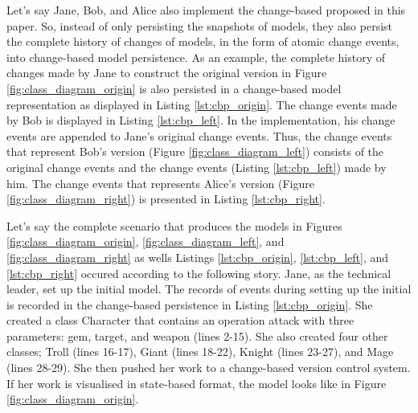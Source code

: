 Let's say Jane, Bob, and Alice also implement the change-based proposed in this paper. So, instead of only persisting the snapshots of models, they also persist the complete history of changes of models, in the form of atomic change events, into change-based model persistence. As an example, the complete history of changes made by Jane to construct the original version in Figure \ref{fig:class_diagram_origin} is also persisted in a change-based model representation as displayed in Listing \ref{lst:cbp_origin}. The change events made by Bob is displayed in Listing \ref{lst:cbp_left}. In the implementation, his change events are appended to Jane's original change events. Thus, the change events that represent Bob's version (Figure \ref{fig:class_diagram_left}) consists of the original change events and the change events (Listing \ref{lst:cbp_left}) made by him. The change events that represents Alice's version (Figure \ref{fig:class_diagram_right}) is presented in Listing \ref{lst:cbp_right}. 



Let's say the complete scenario that produces the models in Figures \ref{fig:class_diagram_origin}, \ref{fig:class_diagram_left}, and \ref{fig:class_diagram_right} as wells Listings \ref{lst:cbp_origin}, \ref{lst:cbp_left}, and \ref{lst:cbp_right} occured according to the following story. Jane, as the technical leader, set up the initial model. The records of events during setting up the initial is recorded in the change-based persistence in Listing \ref{lst:cbp_origin}. She created a class \textsf{Character} that contains an operation \textsf{attack} with three parameters: \textsf{gem}, \textsf{target}, and \textsf{weapon} (lines 2-15). She also created four other classes; \textsf{Troll} (lines 16-17), \textsf{Giant} (lines 18-22), \textsf{Knight} (lines 23-27), and \textsf{Mage} (lines 28-29). She then pushed her work to a change-based version control system. If her work is visualised in state-based format, the model looks like in Figure \ref{fig:class_diagram_origin}.

